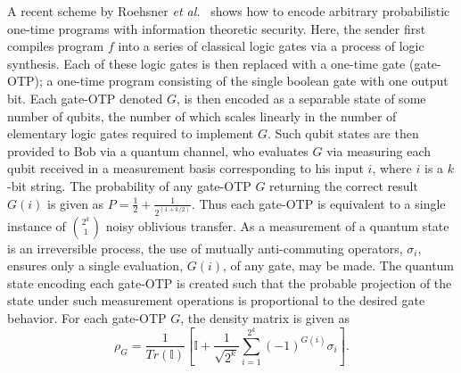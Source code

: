 A recent scheme by Roehsner \textit{et al.}~\cite{roehsner2017quantum} shows how to encode arbitrary probabilistic one-time programs with information theoretic security.  Here, the sender first compiles program $f$ into a series of classical logic gates via a process of logic synthesis.  Each of these logic gates is then replaced with a one-time gate (gate-OTP); a one-time program consisting of the single boolean gate with one output bit. Each gate-OTP denoted $G$, is then encoded as a separable state of some number of qubits, the number of which scales linearly in the number of elementary logic gates required to implement $G$. Such qubit states are then provided to Bob via a quantum channel, who evaluates $G$ via measuring each qubit received in a measurement basis corresponding to his input $i$, where $i$ is a $k$-bit string. The probability of any gate-OTP $G$ returning the correct result $G(i)$ is given as $P = \frac{1}{2}+\frac{1}{2^{(1+k/2)}}$. Thus each gate-OTP is equivalent to a single instance of $\binom{2^k}{1}$ noisy oblivious transfer. As a measurement of a quantum state is an irreversible process, the use of mutually anti-commuting operators, $\sigma_i$, ensures only a single evaluation, $G(i)$, of any gate, may be made. The quantum state encoding each gate-OTP is created such that the probable projection of the state under such measurement operations is proportional to the desired gate behavior. For each gate-OTP $G$, the density matrix is given as
 \begin{equation}
\rho_G = \frac{1}{Tr(\mathbb{I})} \left[ \mathbb{I} + \frac{1}{\sqrt{2^k}}\sum _{i=1} ^{2^{k}} (-1)^{G(i)} \sigma_i \right] .
\label{otpeq}
\end{equation}


